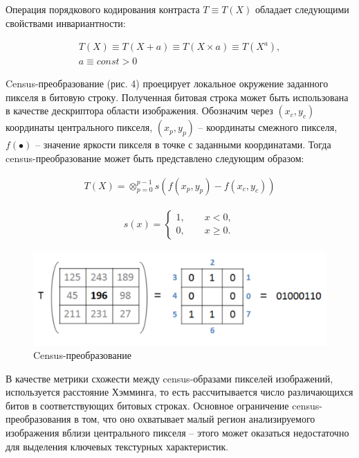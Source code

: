 \documentclass[a4paper, 14pt]{extarticle}	%
\begin{document}
Операция   порядкового   кодирования   контраста $T \equiv T(X)$ обладает  следующими свойствами инвариантности:

\begin{gather}
T(X) \equiv T(X+a) \equiv T(X \times a) \equiv T(X^a), \\
a \equiv const > 0 \nonumber
\end{gather}

Census-преобразование (рис. 4) проецирует локальное окружение заданного  пикселя  в  битовую  строку.  Полученная  битовая  строка  может быть использована  в  качестве  дескриптора  области  изображения. Обозначим  через $(x_c, y_c)$ координаты  центрального  пикселя, $(x_p, y_p)$ -- координаты  смежного пикселя, $f(\bullet)$ -- значение яркости пикселя в точке с заданными координатами. Тогда census-преобразование может быть представлено следующим образом:

\begin{gather}
T(X) = \otimes_{p=0}^{p-1}s(f(x_p, y_p)-f(x_c, y_c))
\end{gather}

\begin{gather}
s(x) =
  \begin{cases}
    1,\qquad x < 0,\\
    0,\qquad x \ge 0.
 \end{cases}
\end{gather}

\begin{figure}[h!]
\centering
\includegraphics[scale=0.35]{res/pic004}
\caption{Census-преобразование}
\end{figure}

В качестве метрики схожести между census-образами пикселей изображений, используется расстояние Хэмминга, то есть рассчитывается число различающихся битов  в  соответствующих  битовых строках.  Основное  ограничение census-преобразования  в  том,  что  оно  охватывает малый  регион  анализируемого изображения вблизи центрального пикселя -- этого может оказаться недостаточно для выделения ключевых текстурных характеристик.
\end{document}
